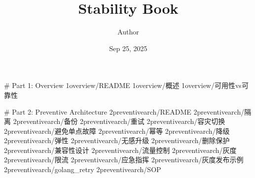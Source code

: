 \documentclass[a4paper,12pt,english]{sphinxmanual}
\title{Stability Book}
\date{Sep 25, 2025}
\author{Author}
\begin{document}
\pagestyle{empty}
\sphinxmaketitle
\pagestyle{plain}
\sphinxtableofcontents
\pagestyle{normal}
\label{\detokenize{index::doc}}


\sphinxAtStartPar
\# Part 1: Overview
1\sphinxhyphen{}overview/README
1\sphinxhyphen{}overview/概述
1\sphinxhyphen{}overview/可用性vs可靠性

\sphinxAtStartPar
\# Part 2: Preventive Architecture
2\sphinxhyphen{}preventive\sphinxhyphen{}arch/README
2\sphinxhyphen{}preventive\sphinxhyphen{}arch/隔离
2\sphinxhyphen{}preventive\sphinxhyphen{}arch/备份
2\sphinxhyphen{}preventive\sphinxhyphen{}arch/重试
2\sphinxhyphen{}preventive\sphinxhyphen{}arch/容灾切换
2\sphinxhyphen{}preventive\sphinxhyphen{}arch/避免单点故障
2\sphinxhyphen{}preventive\sphinxhyphen{}arch/幂等
2\sphinxhyphen{}preventive\sphinxhyphen{}arch/降级
2\sphinxhyphen{}preventive\sphinxhyphen{}arch/弹性
2\sphinxhyphen{}preventive\sphinxhyphen{}arch/无感升级
2\sphinxhyphen{}preventive\sphinxhyphen{}arch/删除保护
2\sphinxhyphen{}preventive\sphinxhyphen{}arch/兼容性设计
2\sphinxhyphen{}preventive\sphinxhyphen{}arch/流量控制
2\sphinxhyphen{}preventive\sphinxhyphen{}arch/灰度
2\sphinxhyphen{}preventive\sphinxhyphen{}arch/限流
2\sphinxhyphen{}preventive\sphinxhyphen{}arch/应急指挥
2\sphinxhyphen{}preventive\sphinxhyphen{}arch/灰度发布示例
2\sphinxhyphen{}preventive\sphinxhyphen{}arch/golang\_retry
2\sphinxhyphen{}preventive\sphinxhyphen{}arch/SOP



\renewcommand{\indexname}{Index}
\printindex
\end{document}
